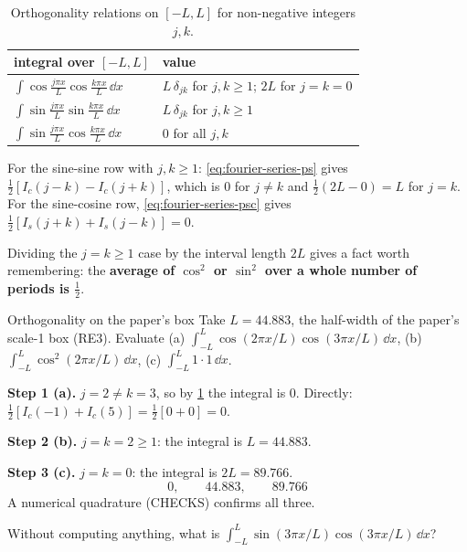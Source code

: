 \begin{table}[htbp]\centering
\caption{Orthogonality relations on $[-L,L]$ for non-negative integers $j,k$.}
\label{tab:fourier-series-orth}
\begin{tabular}{ll}
\toprule
integral over $[-L,L]$ & value\\
\midrule
$\int\cos\frac{j\pi x}{L}\cos\frac{k\pi x}{L}\,\dd x$ & $L\,\delta_{jk}$ for $j,k\ge1$; \quad $2L$ for $j=k=0$\\
$\int\sin\frac{j\pi x}{L}\sin\frac{k\pi x}{L}\,\dd x$ & $L\,\delta_{jk}$ for $j,k\ge1$\\
$\int\sin\frac{j\pi x}{L}\cos\frac{k\pi x}{L}\,\dd x$ & $0$ for all $j,k$\\
\bottomrule
\end{tabular}
\end{table}

For the sine-sine row with $j,k\ge1$: \cref{eq:fourier-series-ps} gives $\tfrac12[I_c(j-k)-I_c(j+k)]$, which is $0$ for $j\neq k$ and $\tfrac12(2L-0)=L$ for $j=k$. For the sine-cosine row, \cref{eq:fourier-series-psc} gives $\tfrac12[I_s(j+k)+I_s(j-k)]=0$.

Dividing the $j=k\ge1$ case by the interval length $2L$ gives a fact worth remembering: the \textbf{average of $\cos^2$ or $\sin^2$ over a whole number of periods is $\tfrac12$}.

\begin{sample}{Orthogonality on the paper's box}
Take $L=44.883$, the half-width of the paper's scale-1 box (RE3). Evaluate (a) $\int_{-L}^{L}\cos(2\pi x/L)\cos(3\pi x/L)\,\dd x$, (b) $\int_{-L}^{L}\cos^2(2\pi x/L)\,\dd x$, (c) $\int_{-L}^{L}1\cdot1\,\dd x$.

\textbf{Step 1 (a).} $j=2\neq k=3$, so by \cref{tab:fourier-series-orth} the integral is $0$. Directly: $\tfrac12[I_c(-1)+I_c(5)]=\tfrac12[0+0]=0$.

\textbf{Step 2 (b).} $j=k=2\ge1$: the integral is $L=44.883$.

\textbf{Step 3 (c).} $j=k=0$: the integral is $2L=89.766$.
\[
\boxed{0,\qquad 44.883,\qquad 89.766}
\]
A numerical quadrature (CHECKS) confirms all three.
\end{sample}

\begin{checkpoint}
Without computing anything, what is $\int_{-L}^{L}\sin(3\pi x/L)\cos(3\pi x/L)\,\dd x$?
\end{checkpoint}

